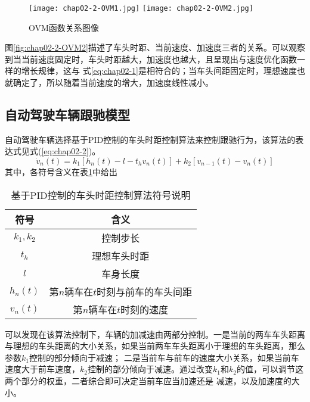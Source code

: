 \begin{figure}
  \centering
    {\texttt{[image: chap02-2-OVM1.jpg]}}
    {\texttt{[image: chap02-2-OVM2.jpg]}}
  \caption{OVM函数关系图像}
  \label{fig:chap02-2-OVM}
\end{figure}

图\ref{fig:chap02-2-OVM2}描述了车头时距、当前速度、加速度三者的关系。可以观察到当当前速度固定时，车头时距越大，加速度也越大，且呈现出与速度优化函数一样的增长规律，这与
式\ref{eq:chap02-1}是相符合的；当车头间距固定时，理想速度也就确定了，所以随着当前速度的增大，加速度线性减小。

\subsection{自动驾驶车辆跟驰模型}

自动驾驶车辆选择基于PID控制的车头时距控制算法来控制跟驰行为，该算法的表达式见式(\ref{eq:chap02-2})。
\begin{equation}
  \dot{v}_n(t) = k_1 \left[ h_n(t) - l - t_hv_n(t) \right] + k_2 \left[ v_{n-1}(t) - v_n(t) \right]
  \label{eq:chap02-2}
\end{equation}
其中，各符号含义在表\ref{tab:chap02-2}中给出

\begin{table}
  \centering
  \caption{基于PID控制的车头时距控制算法符号说明}
  \begin{tabular}{cc}
    \toprule
    符号          &  含义                         \\
    \midrule
    $k_1, k_2$            & 控制步长         \\
    $t_h$                 & 理想车头时距             \\
    $l$                   & 车身长度          \\
    $h_n(t)$              & 第$n$辆车在$t$时刻与前车的车头间距        \\
    $v_n(t)$              & 第$n$辆车在$t$时刻的速度 \\
    \bottomrule
  \end{tabular}
  \label{tab:chap02-2}
\end{table}

可以发现在该算法控制下，车辆的加减速由两部分控制。一是当前的两车车头距离与理想的车头距离的大小关系，如果当前两车车头距离小于理想的车头距离，那么参数$k_1$控制的部分倾向于减速；
二是当前车与前车的速度大小关系，如果当前车速度大于前车速度，$k_2$控制的部分倾向于减速。通过改变$k_1$和$k_2$的值，可以调节这两个部分的权重，二者综合即可决定当前车应当加速还是
减速，以及加速度的大小。


